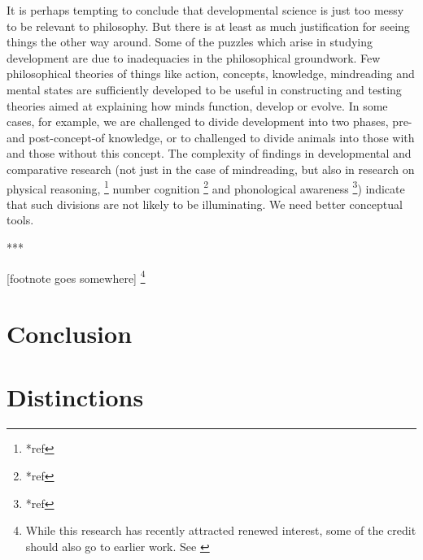 \documentclass[11pt,a4paper]{extarticle}
\begin{document}
It is perhaps tempting to conclude that developmental science is just too messy to be relevant to philosophy.
But there is at least as much justification for seeing things the other way around.
Some of the puzzles which arise in studying development are due to inadequacies in the philosophical groundwork.
Few philosophical theories of things like action, concepts, knowledge, mindreading and mental states are sufficiently developed to be useful in constructing and testing theories aimed at explaining 
 how minds function, develop or evolve.
In some cases, for example, we are challenged to divide development into two phases, pre- and post-concept-of knowledge, or to challenged to divide animals into those with and those without this concept.
The complexity of findings in developmental and comparative research (not just in the case of mindreading, but also in research on physical reasoning,%
\footnote{
*ref
}
number cognition%
\footnote{
*ref
}
and phonological awareness%
\footnote{
*ref
}) 
indicate that such divisions are not likely to be illuminating.
We need better conceptual tools.


***

[footnote goes somewhere]%
\footnote{
While this research has recently attracted renewed interest, some of the credit should also go to earlier work. 
See \citet{Clements:1994cw,Garnham:2001jm,Garnham:2001ql,Ruffman:2001ng}
}


%

\section{Conclusion}





 
 

\section{Distinctions}
\end{document}
